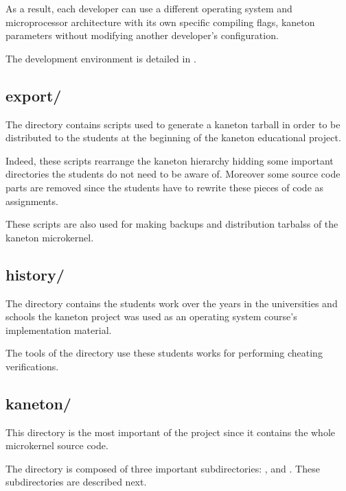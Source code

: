 As a result, each developer can use a different operating system and
microprocessor architecture with its own specific compiling flags, kaneton
parameters \etc{} without modifying another developer's configuration.

The development environment is detailed in .

%
%

\subsection*{export/}

The  directory contains scripts used to generate a kaneton
tarball in order to be distributed to the students at the beginning of the
kaneton educational project.

Indeed, these scripts rearrange the kaneton hierarchy hidding some important
directories the students do not need to be aware of. Moreover some source
code parts are removed since the students have to rewrite these pieces
of code as assignments.

These scripts are also used for making backups and distribution tarbalss of
the kaneton microkernel.

%
%

\subsection*{history/}

The  directory contains the students work over the years
in the universities and schools the kaneton project was used as an operating
system course's implementation material.

The tools of the  directory use these students works for
performing cheating verifications.

%
%

\subsection*{kaneton/}

This directory is the most important of the project since it contains
the whole microkernel source code.

The directory is composed of three important subdirectories: ,
 and . These subdirectories are described
next.

